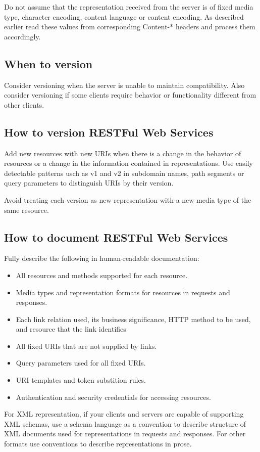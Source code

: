 \documentclass[11pt,a4paper]{article}
\begin{document}
Do not assume that the representation received from the server is of fixed media type, character encoding, content language or content encoding. As described earlier read these values from corresponding Content-* headers and process them accordingly.

\subsection{When to version}
Consider versioning when the server is unable to maintain compatibility. Also consider versioning if some clients require behavior or functionality different from other clients.

\subsection{How to version RESTFul Web Services}
Add new resources with new URIs when there is a change in the behavior of resources or a change in the information contained in representations. Use easily detectable patterns usch as v1 and v2 in subdomain names, path segments or query parameters to distinguish URIs by their version.

Avoid treating each version as new representation with a new media type of the same resource.

\subsection{How to document RESTFul Web Services}
Fully describe the following in human-readable documentation:
\begin{itemize}
	\item All resources and methods supported for each resource.
	\item Media types and representation formats for resources in requests and responses.
	\item Each link relation used, its business significance, HTTP method to be used, and resource that the link identifies
	\item All fixed URIs that are not supplied by links.
	\item Query parameters used for all fixed URIs.
	\item URI templates and token substition rules.
	\item Authentication and security credentials for accessing resources.
\end{itemize}

For XML representation, if your clients and servers are capable of supporting XML schemas, use a schema language as a convention to describe structure of XML documents used for representations in requests and responses. For other formats use conventions to describe representations in prose.
\end{document}

